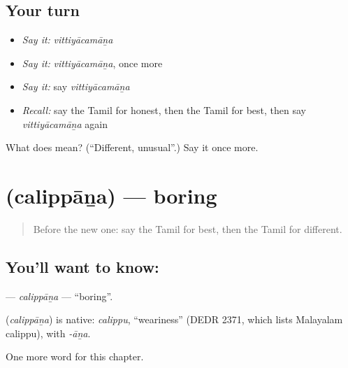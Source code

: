 \subsection*{Your turn}
\begin{itemize}
\raggedright
  \item \emph{Say it:} \emph{vittiyācamāṉa}
  \item \emph{Say it:} \emph{vittiyācamāṉa}, once more
  \item \emph{Say it:} say \emph{vittiyācamāṉa}
  \item \emph{Recall:} say the Tamil for honest, then the Tamil for best, then say \emph{vittiyācamāṉa} again
\end{itemize}

\begin{tcolorbox}[breakable,colback=teal!4,colframe=teal!35!black,title={Before you move on}]
What does  mean? (\textquotedblleft{}Different, unusual\textquotedblright{}.) Say it once more.
\end{tcolorbox}
\section[\texorpdfstring{\ta{சலிப்பான} (calippāṉa)}{சலிப்பான (calippāṉa)}]{ (calippāṉa) — boring}

\label{lesson:TA-C269-calippana}



\begin{quote}
Before the new one: say the Tamil for best, then the Tamil for different.
\end{quote}

\subsection*{You'll want to know: }
\textbf{} — \emph{calippāṉa} — \textquotedblleft{}boring\textquotedblright{}.

\begin{cousinweb}
\textbf{} (\emph{calippāṉa}) is native: \emph{calippu}, \textquotedblleft{}weariness\textquotedblright{} (DEDR 2371, which lists Malayalam calippu), with \emph{-āṉa}.
\end{cousinweb}

\begin{grammarlens}[title={What you've built}]
One more word for this chapter.
\end{grammarlens}

